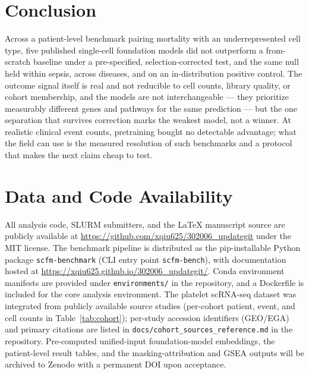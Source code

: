 \documentclass[11pt,a4paper]{article}
\begin{document}
\section{Conclusion}
\label{sec:conclusion}

Across a patient-level benchmark pairing mortality with an underrepresented
cell type, five published single-cell foundation models did not outperform a
from-scratch baseline under a pre-specified, selection-corrected test, and
the same null held within sepsis, across diseases, and on an in-distribution
positive control. The outcome signal itself is real and not reducible to cell
counts, library quality, or cohort membership, and the models are not
interchangeable --- they prioritize measurably different genes and pathways
for the same prediction --- but the one separation that survives correction
marks the weakest model, not a winner. At realistic clinical event counts,
pretraining bought no detectable advantage; what the field can use is the
measured resolution of such benchmarks and a protocol that makes the next
claim cheap to test.


\section{Data and Code Availability}

All analysis code, SLURM submitters, and the LaTeX manuscript source are
publicly available at \url{https://github.com/xqiu625/302006_updategit} under
the MIT license. The benchmark pipeline is distributed as the pip-installable
Python package \texttt{scfm-benchmark} (CLI entry point \texttt{scfm-bench}),
with documentation hosted at
\url{https://xqiu625.github.io/302006_updategit/}. Conda environment manifests
are provided under \texttt{environments/} in the repository, and a Dockerfile
is included for the core analysis environment. The platelet scRNA-seq dataset
was integrated from publicly available source studies (per-cohort patient,
event, and cell counts in Table~\ref{tab:cohort}); per-study accession
identifiers (GEO/EGA) and primary citations are listed in
\texttt{docs/cohort\_sources\_reference.md} in the repository. Pre-computed
unified-input foundation-model embeddings, the patient-level result tables,
and the masking-attribution and GSEA outputs will be archived to Zenodo with
a permanent DOI upon acceptance.
\end{document}
